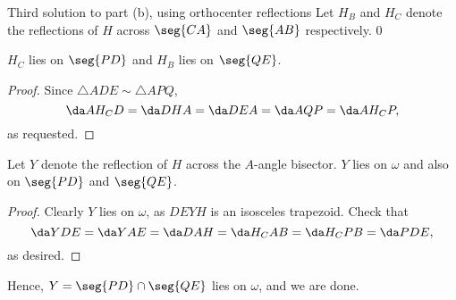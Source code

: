 \begin{customenv}{Third solution to part (b), using orthocenter reflections}
    Let $H_B$ and $H_C$ denote the reflections of $H$ across $\seg{CA}$ and $\seg{AB}$ respectively.
    \setcounter{iclaim}0
    \begin{iclaim}
        $H_C$ lies on $\seg{PD}$ and $H_B$ lies on $\seg{QE}$.
    \end{iclaim}
    \begin{proof}
        Since $\triangle ADE\sim\triangle APQ$, \[\da AH_CD=\da DHA=\da DEA=\da AQP=\da AH_CP,\]
        as requested.
    \end{proof}
    \begin{iclaim}
        Let $Y$ denote the reflection of $H$ across the $A$-angle bisector. $Y$ lies on $\omega$ and also on $\seg{PD}$ and $\seg{QE}$.
    \end{iclaim}
    \begin{proof}
        Clearly $Y$ lies on $\omega$, as $DEYH$ is an isosceles trapezoid. Check that \[\da YDE=\da YAE=\da DAH=\da H_CAB=\da H_CPB=\da PDE,\]
        as desired.
    \end{proof}

    Hence, $Y=\seg{PD}\cap\seg{QE}$ lies on $\omega$, and we are done. 
\end{customenv}
